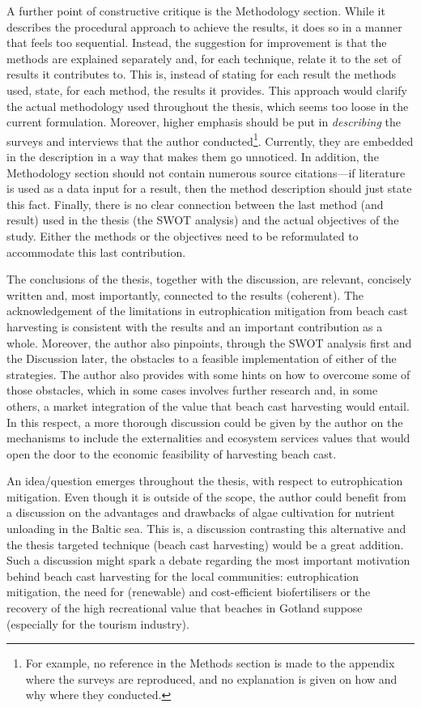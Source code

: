 \documentclass[a4paper,fontsize=11pt,bibliography=totoc]{scrartcl}
\begin{document}
A further point of constructive critique is the Methodology section. While it describes the procedural approach to achieve the results, it does so in a manner that feels too sequential. Instead, the suggestion for improvement is that the methods are explained separately and, for each technique, relate it to the set of results it contributes to. This is, instead of stating for each result the methods used, state, for each method, the results it provides. This approach would clarify the actual methodology used throughout the thesis, which seems too loose in the current formulation. Moreover, higher emphasis should be put in \emph{describing} the surveys and interviews that the author conducted\footnote{For example, no reference in the Methods section is made to the appendix where the surveys are reproduced, and no explanation is given on how and why where they conducted.}. Currently, they are embedded in the description in a way that makes them go unnoticed. In addition, the Methodology section should not contain numerous source citations---if literature is used as a data input for a result, then the method description should just state this fact. Finally, there is no clear connection between the last method (and result) used in the thesis (the SWOT analysis) and the actual objectives of the study. Either the methods or the objectives need to be reformulated to accommodate this last contribution.

The conclusions of the thesis, together with the discussion, are relevant, concisely written and, most importantly, connected to the results (coherent). The acknowledgement of the limitations in eutrophication mitigation from beach cast harvesting is consistent with the results and an important contribution as a whole. Moreover, the author also pinpoints, through the SWOT analysis first and the Discussion later, the obstacles to a feasible implementation of either of the strategies. The author also provides with some hints on how to overcome some of those obstacles, which in some cases involves further research and, in some others, a market integration of the value that beach cast harvesting would entail. In this respect, a more thorough discussion could be given by the author on the mechanisms to include the externalities and ecosystem services values that would open the door to the economic feasibility of harvesting beach cast.

An idea/question emerges throughout the thesis, with respect to eutrophication mitigation. Even though it is outside of the scope, the author could benefit from a discussion on the advantages and drawbacks of algae cultivation for nutrient unloading in the Baltic sea. This is, a discussion contrasting this alternative and the thesis targeted technique (beach cast harvesting) would be a great addition. Such a discussion might spark a debate regarding the most important motivation behind beach cast harvesting for the local communities: eutrophication mitigation, the need for (renewable) and cost-efficient biofertilisers or the recovery of the high recreational value that beaches in Gotland suppose (especially for the tourism industry).
\end{document}
